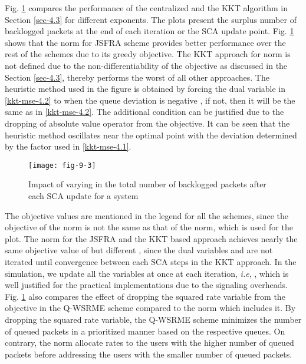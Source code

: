 Fig. \ref{fig-d-3.1} compares the performance of the centralized and the \ac{KKT} algorithm in Section \ref{sec-4.3} for different exponents. The plots present the surplus number of backlogged packets at the end of each iteration or the \ac{SCA} update point. Fig. \ref{fig-d-3.1} shows that the  norm for \ac{JSFRA} scheme provides better performance over the rest of the schemes due to its greedy objective. The \ac{KKT} approach for  norm is not defined due to the non-differentiability of the objective as discussed in the Section \ref{sec-4.3}, thereby performs the worst of all other approaches. The heuristic method used in the figure is obtained by forcing the dual variable  in \eqref{kkt-mse-4.2} to  when the queue deviation is negative , if not, then it will be the same as in \eqref{kkt-mse-4.2}. The additional condition can be justified due to the dropping of absolute value operator from the objective. It can be seen that the heuristic method oscillates near the optimal point with the deviation determined by the factor \me{\rho} used in \eqref{kkt-mse-4.1}.
\begin{figure}
	\centering
	\texttt{[image: fig-9-3]}
	\caption{Impact of varying  in the total number of backlogged packets after each \ac{SCA} update for a system }
	\label{fig-d-3.1} \vspace{-0.1in}
\end{figure}

The objective values are mentioned in the legend for all the schemes, since the objective of the  norm is not the same as that of the  norm, which is used for the plot. The  norm for the \ac{JSFRA} and the \ac{KKT} based approach achieves nearly the same objective value of  but different \me{\chi}, since the dual variables  and  are not iterated until convergence between each \ac{SCA} steps in the \ac{KKT} approach. In the simulation, we update all the variables at once at each iteration, \textit{i.e}, , which is well justified for the practical implementations due to the signaling overheads. Fig. \ref{fig-d-3.1} also compares the effect of dropping the squared rate variable from the objective in the \ac{Q-WSRME} scheme compared to the  norm which includes it. By dropping the squared rate variable, the \ac{Q-WSRME} scheme minimizes the number of queued packets in a prioritized manner based on the respective queues. On contrary, the  norm allocate rates to the users with the higher number of queued packets before addressing the users with the smaller number of queued packets.



